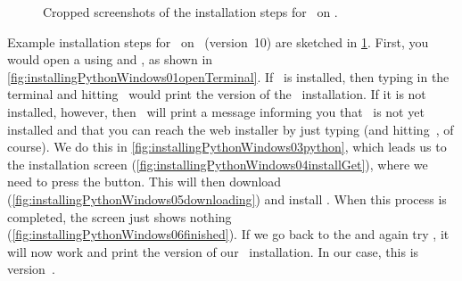 %
%
\begin{figure}%
\centering%
%
\floatSep%
%
%
%
\floatSep%
%
%
%
\floatRowSep%
%
%
\floatSep%
%
%
%
\floatRowSep%
%
%
%
\floatSep%
%
%
%
\caption{Cropped screenshots of the installation steps for \python\ on \microsoftWindows.}%
\label{fig:installPythonWindows}%
\end{figure}%
%
Example installation steps for \python\ on \microsoftWindows\ (version~10) are sketched in \cref{fig:installPythonWindows}.
First, you would open a  using and \windowsTerminal, as shown in \cref{fig:installingPythonWindows01openTerminal}.
If \python\ is installed, then typing  in the terminal and hitting~\keys{\return} would print the version of the \python\ installation.
If it is not installed, however, then \microsoftWindows\ will print a message informing you that \python\ is not yet installed and that you can reach the web installer by just typing  (and hitting~\keys{\return}, of course).
We do this in \cref{fig:installingPythonWindows03python}, which leads us to the installation screen (\cref{fig:installingPythonWindows04installGet}), where we need to press the  button.
This will then download (\cref{fig:installingPythonWindows05downloading}) and install \python.
When this process is completed, the screen just shows nothing (\cref{fig:installingPythonWindows06finished}).
If we go back to the  and again try , it will now work and print the version of our \python\ installation.
In our case, this is version~.%
%
\FloatBarrier%
\endhsection%
%
